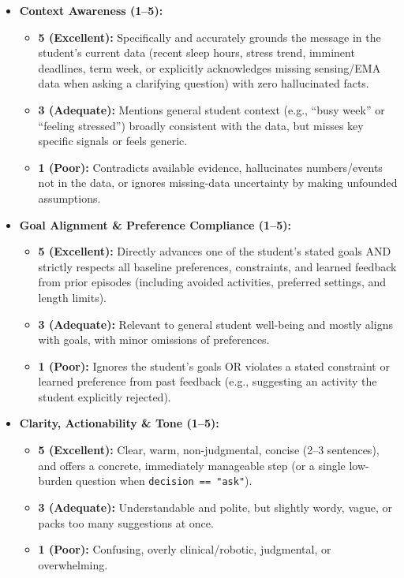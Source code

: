 \documentclass{article}
\begin{document}
\begin{itemize}
  \item \textbf{Context Awareness (1--5):}
        \begin{itemize}
          \item \textbf{5 (Excellent):} Specifically and accurately grounds the message in the student's current data (recent sleep hours, stress trend, imminent deadlines, term week, or explicitly acknowledges missing sensing/EMA data when asking a clarifying question) with zero hallucinated facts.
          \item \textbf{3 (Adequate):} Mentions general student context (e.g., ``busy week'' or ``feeling stressed'') broadly consistent with the data, but misses key specific signals or feels generic.
          \item \textbf{1 (Poor):} Contradicts available evidence, hallucinates numbers/events not in the data, or ignores missing-data uncertainty by making unfounded assumptions.
        \end{itemize}
  \item \textbf{Goal Alignment \& Preference Compliance (1--5):}
        \begin{itemize}
          \item \textbf{5 (Excellent):} Directly advances one of the student's stated goals AND strictly respects all baseline preferences, constraints, and learned feedback from prior episodes (including avoided activities, preferred settings, and length limits).
          \item \textbf{3 (Adequate):} Relevant to general student well-being and mostly aligns with goals, with minor omissions of preferences.
          \item \textbf{1 (Poor):} Ignores the student's goals OR violates a stated constraint or learned preference from past feedback (e.g., suggesting an activity the student explicitly rejected).
        \end{itemize}
  \item \textbf{Clarity, Actionability \& Tone (1--5):}
        \begin{itemize}
          \item \textbf{5 (Excellent):} Clear, warm, non-judgmental, concise (2--3 sentences), and offers a concrete, immediately manageable step (or a single low-burden question when \texttt{decision == "ask"}).
          \item \textbf{3 (Adequate):} Understandable and polite, but slightly wordy, vague, or packs too many suggestions at once.
          \item \textbf{1 (Poor):} Confusing, overly clinical/robotic, judgmental, or overwhelming.
        \end{itemize}
\end{itemize}
\end{document}
